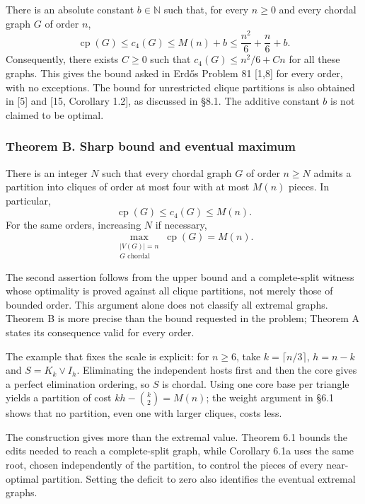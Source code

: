 \documentclass[english,11pt,a4paper]{article}
\begin{document}
There is an absolute constant \(b\in\mathbb N\) such that, for every \(n\ge0\) and every chordal graph \(G\) of order \(n\), \[
\operatorname{cp}(G)\le c_4(G)\le M(n)+b
\le\frac{n^2}{6}+\frac n6+b.
\tag{A}
\] Consequently, there exists \(C\ge0\) such that \(c_4(G)\le n^2/6+Cn\) for all these graphs. This gives the bound asked in Erdős Problem 81 {[}1,8{]} for every order, with no exceptions. The bound for unrestricted clique partitions is also obtained in {[}5{]} and {[}15, Corollary 1.2{]}, as discussed in §8.1. The additive constant \(b\) is not claimed to be optimal.

\subsubsection{Theorem B. Sharp bound and eventual maximum}\label{theorem-b.-sharp-bound-and-eventual-maximum}

There is an integer \(N\) such that every chordal graph \(G\) of order \(n\ge N\) admits a partition into cliques of order at most four with at most \(M(n)\) pieces. In particular, \[
\operatorname{cp}(G)\le c_4(G)\le M(n).
\tag{1.1}
\] For the same orders, increasing \(N\) if necessary, \[
\max_{\substack{|V(G)|=n\\G\text{ chordal}}}\operatorname{cp}(G)=M(n).
\tag{1.2}
\]

The second assertion follows from the upper bound and a complete-split witness whose optimality is proved against all clique partitions, not merely those of bounded order. This argument alone does not classify all extremal graphs. Theorem B is more precise than the bound requested in the problem; Theorem A states its consequence valid for every order.

The example that fixes the scale is explicit: for \(n\ge6\), take \(k=\lceil n/3\rceil\), \(h=n-k\) and \(S=K_k\vee I_h\). Eliminating the independent hosts first and then the core gives a perfect elimination ordering, so \(S\) is chordal. Using one core base per triangle yields a partition of cost \(kh-\binom k2=M(n)\); the weight argument in §6.1 shows that no partition, even one with larger cliques, costs less.

The construction gives more than the extremal value. Theorem 6.1 bounds the edits needed to reach a complete-split graph, while Corollary 6.1a uses the same root, chosen independently of the partition, to control the pieces of every near-optimal partition. Setting the deficit to zero also identifies the eventual extremal graphs.
\end{document}
